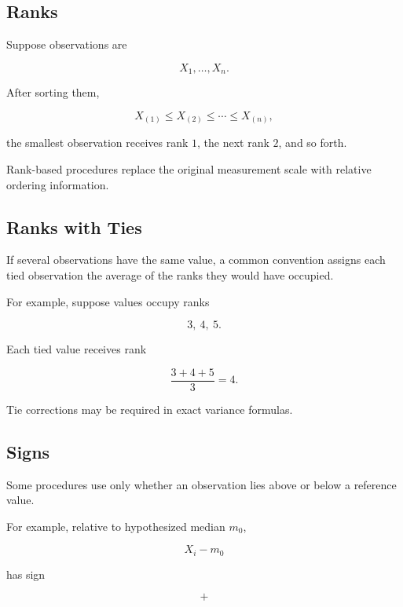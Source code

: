 \subsection{Ranks}
\label{subsec:statistical-ranks}

Suppose observations are

\[
X_1,\ldots,X_n.
\]

After sorting them,

\[
X_{(1)}
\leq
X_{(2)}
\leq
\cdots
\leq
X_{(n)},
\]

the smallest observation receives rank \(1\), the next rank \(2\), and
so forth.

Rank-based procedures replace the original measurement scale with
relative ordering information.

\subsection{Ranks with Ties}
\label{subsec:ranks-with-ties}

If several observations have the same value, a common convention assigns
each tied observation the average of the ranks they would have occupied.

For example, suppose values occupy ranks

\[
3,\ 4,\ 5.
\]

Each tied value receives rank

\[
\boxed{
\frac{3+4+5}{3}
=
4.
}
\]

Tie corrections may be required in exact variance formulas.

\subsection{Signs}
\label{subsec:statistical-signs}

Some procedures use only whether an observation lies above or below a
reference value.

For example, relative to hypothesized median \(m_0\),

\[
X_i-m_0
\]

has sign

\[
+
\]

